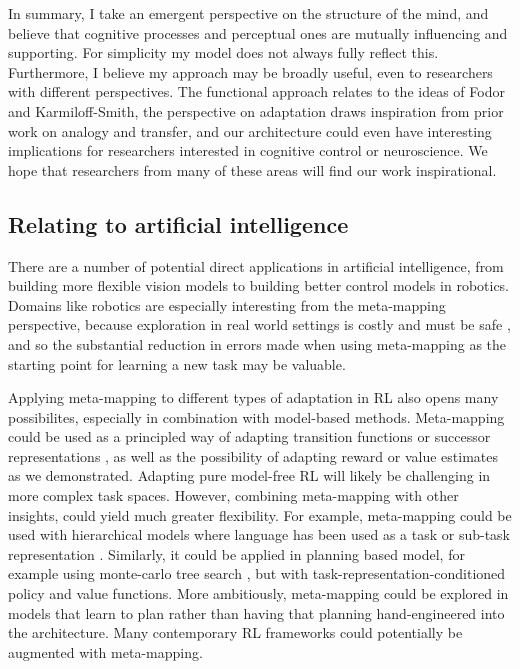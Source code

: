 In summary, I take an emergent perspective on the structure of the mind, and believe that cognitive processes and perceptual ones are mutually influencing and supporting. For simplicity my model does not always fully reflect this. Furthermore, I believe my approach may be broadly useful, even to researchers with different perspectives. The functional approach relates to the ideas of Fodor and Karmiloff-Smith, the perspective on adaptation draws inspiration from prior work on analogy and transfer, and our architecture could even have interesting implications for researchers interested in cognitive control or neuroscience. We hope that researchers from many of these areas will find our work inspirational.

\subsection{Relating to artificial intelligence}

There are a number of potential direct applications in artificial intelligence, from building more flexible vision models to building better control models in robotics. Domains like robotics are especially interesting from the meta-mapping perspective, because exploration in real world settings is costly and must be safe \citep{Turchetta2016}, and so the substantial reduction in errors made when using meta-mapping as the starting point for learning a new task may be valuable. \par 

Applying meta-mapping to different types of adaptation in RL also opens many possibilites, especially in combination with model-based methods. Meta-mapping could be used as a principled way of adapting transition functions or successor representations \citep[c.f.][]{Madarasz2019}, as well as the possibility of adapting reward or value estimates as we demonstrated. Adapting pure model-free RL will likely be challenging in more complex task spaces. However, combining meta-mapping with other insights, could yield much greater flexibility. For example, meta-mapping could be used with hierarchical models where language has been used as a task or sub-task representation \citep[e.g.][]{Jiang2019}. Similarly, it could be applied in planning based model, for example using monte-carlo tree search \citep[as in e.g.][]{Silver2016, Silver2017}, but with task-representation-conditioned policy and value functions. More ambitiously, meta-mapping could be explored in models that learn to plan \citep{Guez2019} rather than having that planning hand-engineered into the architecture. Many contemporary RL frameworks could potentially be augmented with meta-mapping. \par

